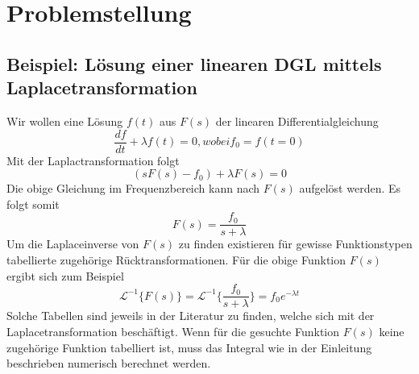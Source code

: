 %
%
%



\section{Problemstellung
\label{laplace:section:problemstellung}}
\subsection{Beispiel: Lösung einer linearen DGL mittels Laplacetransformation}
Wir wollen eine Lösung $f(t)$ aus $F(s)$ der linearen Differentialgleichung 
\[
\frac{df}{dt} + \lambda f(t) = 0, wobei f_{0} = f(t=0)
\]
Mit der Laplactransformation folgt
\[
(sF(s) - f_{0}) + \lambda F(s) = 0
\]
Die obige Gleichung im Frequenzbereich kann nach $F(s)$ aufgelöst werden.
Es folgt somit
\[
F(s) = \frac{f_{0}}{s + \lambda}
\]
Um die Laplaceinverse von $F(s)$ zu finden existieren für gewisse Funktionstypen tabellierte zugehörige Rücktransformationen.
Für die obige Funktion $F(s)$ ergibt sich zum Beispiel
\[
\mathcal{L}^{-1}\{F(s)\}=\mathcal{L}^{-1}\{\frac{f_{0}}{s+\lambda}\} = f_{0}e^{-\lambda t}
\]
Solche Tabellen sind jeweils in der Literatur zu finden, welche sich mit der Laplacetransformation beschäftigt.
Wenn für die gesuchte Funktion $F(s)$ keine zugehörige Funktion tabelliert ist, muss das Integral wie in der Einleitung beschrieben numerisch berechnet werden.

